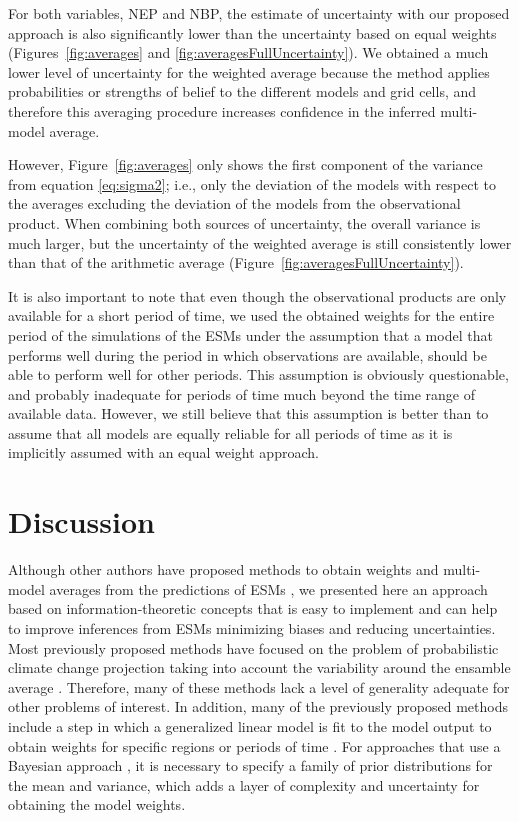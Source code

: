 \documentclass[gmd, manuscript]{copernicus}
\begin{document}
For both variables, NEP and NBP, the estimate of uncertainty with our proposed approach is also significantly lower than the uncertainty based on equal weights (Figures~\ref{fig:averages} and \ref{fig:averagesFullUncertainty}). We obtained a much lower level of uncertainty for the weighted average because the method applies probabilities or strengths of belief to the different models and grid cells, and therefore this averaging procedure increases confidence in the inferred multi-model average. 

However, Figure~\ref{fig:averages} only shows the first component of the variance from equation \ref{eq:sigma2}; i.e., only the deviation of the models with respect to the averages excluding the deviation of the models from the observational product. When combining both sources of uncertainty, the overall variance is much larger, but the uncertainty of the weighted average is still consistently lower than that of the arithmetic average (Figure~\ref{fig:averagesFullUncertainty}). 

It is also important to note that even though the observational products are only available for a short period of time, we used the obtained weights for the entire period of the simulations of the ESMs under the assumption that a model that performs well during the period in which observations are available, should be able to perform well for other periods. This assumption is obviously questionable, and probably inadequate for periods of time much beyond the time range of available data. However, we still believe that this assumption is better than to assume that all models are equally reliable for all periods of time as it is implicitly assumed with an equal weight approach. 

\section{Discussion}
Although other authors have proposed methods to obtain weights and multi-model averages from the predictions of ESMs \citep[and references therein]{Tebaldi2007}, we presented here an approach based on information-theoretic concepts that is easy to implement and can help to improve inferences from ESMs minimizing biases and reducing uncertainties. 
Most previously proposed methods have focused on the problem of probabilistic climate change projection taking into account the variability around the ensamble average \citep{Giorgi2002, Giorgi2003, Tebaldi2005, Knutti2017}. Therefore, many of these methods lack a level of generality adequate for other problems of interest. In addition, many of the previously proposed methods include a step in which a generalized linear model is fit to the model output to obtain weights for specific regions or periods of time \citep{Greene2006}. For approaches that use a Bayesian approach \citep{Tebaldi2005}, it is necessary to specify a family of prior distributions for the mean and variance, which adds a layer of complexity and uncertainty for obtaining the model weights.  
\end{document}
